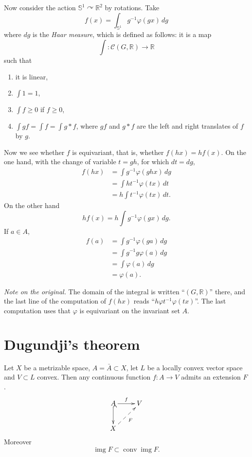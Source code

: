 Now consider the action
$\mathbb{S}^1
\curvearrowright\mathbb{R}^2$ by
rotations. Take
$$
f(x)
=\int_{\mathbb{S}^1}
g^{-1}\varphi(gx)\,dg
$$
where $dg$ is the {\it Haar measure},
which is defined as follows: it is a
map
$$
\int:\mathcal{C}(G,\mathbb{R})
\to\mathbb{R}
$$
such that
\begin{enumerate}
\item it is linear,
\item $\int1=1$,
\item $\int f\geq0$ if $f\geq0$,
\item $\int gf=\int f=\int g*f$, where
$gf$ and $g*f$ are the left and right
translates of $f$ by $g$.
\end{enumerate}
Now we see whether $f$ is equivariant,
that is, whether $f(hx)=hf(x)$. On the
one hand, with the change of variable
$t=gh$, for which $dt=dg$,
$$
\begin{aligned}
f(hx)
&=\int g^{-1}\varphi(ghx)\,dg \\
&=\int ht^{-1}\varphi(tx)\,dt \\
&=h\int t^{-1}\varphi(tx)\,dt.
\end{aligned}
$$
On the other hand
$$
hf(x)=h\int g^{-1}\varphi(gx)\,dg.
$$
If $a\in A$,
$$
\begin{aligned}
f(a)
&=\int g^{-1}\varphi(ga)\,dg \\
&=\int g^{-1}g\varphi(a)\,dg \\
&=\int\varphi(a)\,dg \\
&=\varphi(a).
\end{aligned}
$$

\noindent
{\it Note on the original.} The domain
of the integral is written
``$(G,\mathbb{R})$'' there, and the
last line of the computation of $f(hx)$
reads
``$h\varphi t^{-1}\varphi(tx)$''. The
last computation uses that $\varphi$ is
equivariant on the invariant set $A$.

\section{Dugundji's theorem}
\label{section-dugundji}

\begin{theorem}[Dugundji]
\label{theorem-dugundji}
Let $X$ be a metrizable space,
$A=\bar{A}\subset X$, let $L$ be a
locally convex vector space and
$V\subset L$ convex. Then any
continuous function $f:A\to V$ admits
an extension $F$.
$$
\xymatrix{
A \ar[r]^-{f} \ar@{^{(}->}[d]
  & V \\
X \ar@{-->}[ur]_{F}
}
$$
Moreover
$$
\operatorname{img}F
\subset\operatorname{conv}
\operatorname{img}F.
$$
\end{theorem}

